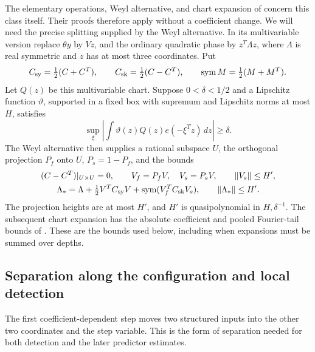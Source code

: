 The elementary operations, Weyl alternative, and chart expansion of
\cite[Lemmas~4.2--4.4]{H} concern this class itself.  Their proofs
therefore apply without a coefficient change.  We will need the precise
splitting supplied by the Weyl alternative.  In its multivariable
version replace \(\theta y\) by \(Vz\), and the ordinary quadratic
phase by \(z^T\Lambda z\), where \(\Lambda\) is real symmetric and
\(z\) has at most three coordinates.  Put
\[
 C_{\rm sy}=\tfrac12(C+C^T),\qquad
 C_{\rm sk}=\tfrac12(C-C^T),\qquad
 \operatorname{sym}M=\tfrac12(M+M^T).
\]
Let \(Q(z)\) be this multivariable chart.  Suppose \(0<\delta<1/2\)
and a Lipschitz function \(\vartheta\), supported in a fixed box
with supremum and Lipschitz norms at most \(H\), satisfies
\[
 \sup_\xi\left|\int\vartheta(z)Q(z)e(-\xi^Tz)\,dz\right|\ge\delta.
\]
The Weyl alternative then supplies a rational subspace \(U\), the
orthogonal projection \(P_f\) onto \(U\), \(P_s=1-P_f\), and the bounds
\begin{equation}
 \begin{gathered}
 (C-C^T)|_{U\times U}=0,\qquad
 V_f=P_fV,\quad V_s=P_sV,\qquad \lVert V_s\rVert\le H',\\
 \Lambda_*=
 \Lambda+\tfrac12V^TC_{\rm sy}V
            +\operatorname{sym}(V_f^TC_{\rm sk}V_s),
 \qquad \lVert\Lambda_*\rVert\le H'.
 \label{eq:analytic-splitting}
\end{gathered}
\end{equation}
The projection heights are at most \(H'\), and \(H'\) is
quasipolynomial in \(H,\delta^{-1}\).  The subsequent
chart expansion has the absolute coefficient and pooled Fourier-tail
bounds of \cite[Lemma~4.4]{H}.  These are the bounds used below, including
when expansions must be summed over depths.

\subsection{Separation along the configuration and local detection}

The first coefficient-dependent step moves two structured inputs into
the other two coordinates and the step variable.  This is the form of
separation needed for both detection and the later predictor estimates.


